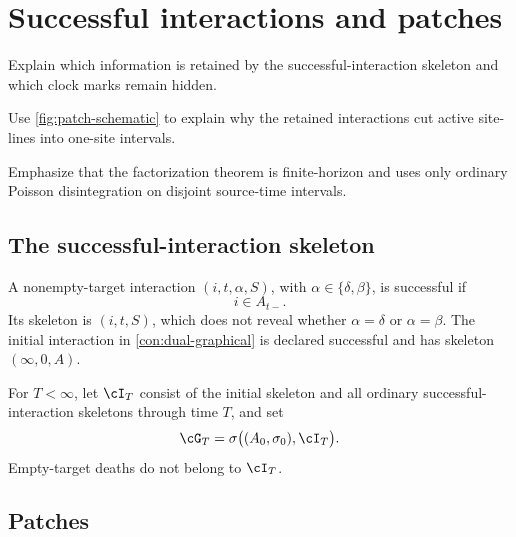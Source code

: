 \section{Successful interactions and patches}
\label{sec:patches}

\begin{discussion}
  \item Explain which information is retained by the
  successful-interaction skeleton and which clock marks remain hidden.
  \item Use \cref{fig:patch-schematic} to explain why the retained
  interactions cut active site-lines into one-site intervals.
  \item Emphasize that the factorization theorem is finite-horizon and
  uses only ordinary Poisson disintegration on disjoint source-time
  intervals.
\end{discussion}

\subsection{The successful-interaction skeleton}

\begin{definition}
\label{def:successful-interaction}
A nonempty-target interaction \((i,t,\alpha,S)\), with
\(\alpha\in\{\delta,\beta\}\), is successful if
\[
  i\in A_{t-}.
\]
Its skeleton is \((i,t,S)\), which does not reveal whether
\(\alpha=\delta\) or \(\alpha=\beta\). The initial interaction in
\cref{con:dual-graphical} is declared successful and has skeleton
\((\infty,0,A)\).
\end{definition}

\begin{definition}
\label{def:finite-skeleton}
For \(T<\infty\), let \(\cI_T\) consist of the initial skeleton and all
ordinary successful-interaction skeletons through time \(T\), and set
\begin{equation}
  \cG_T=\sigma\bigl((A_0,\sigma_0),\cI_T\bigr).
  \label{eq:skeleton-sigma-field}
\end{equation}
Empty-target deaths do not belong to \(\cI_T\).
\end{definition}

\subsection{Patches}

